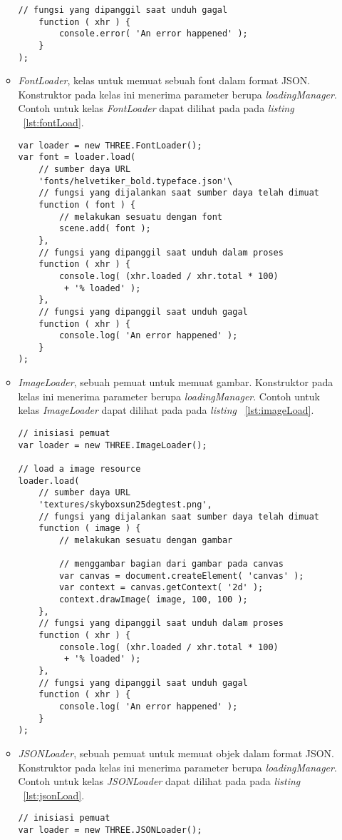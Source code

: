 \begin{itemize}
\begin{itemize}
\begin{lstlisting}[caption={Contoh penggunaan kelas {\it FileLoader} untuk berkas dengan format TXT.}, label={lst:fileLoad},captionpos=b]
    // fungsi yang dipanggil saat unduh gagal
    function ( xhr ) {
        console.error( 'An error happened' );
    }
);
\end{lstlisting}
		\item {\it FontLoader}, kelas untuk memuat sebuah font dalam format JSON. Konstruktor pada kelas ini menerima parameter berupa  {\it loadingManager}. Contoh untuk kelas {\it FontLoader} dapat dilihat pada pada {\it listing} ~\ref{lst:fontLoad}.
\begin{lstlisting}[caption={Contoh penggunaan kelas {\it FontLoader}.}, label={lst:fontLoad},captionpos=b]
var loader = new THREE.FontLoader();
var font = loader.load(
	// sumber daya URL
	'fonts/helvetiker_bold.typeface.json'\
	// fungsi yang dijalankan saat sumber daya telah dimuat
	function ( font ) {
		// melakukan sesuatu dengan font
		scene.add( font );
	},
	// fungsi yang dipanggil saat unduh dalam proses
	function ( xhr ) {
		console.log( (xhr.loaded / xhr.total * 100)
		 + '% loaded' );
	},
	// fungsi yang dipanggil saat unduh gagal
	function ( xhr ) {
		console.log( 'An error happened' );
	}
);
\end{lstlisting}
		\item {\it ImageLoader}, sebuah pemuat untuk memuat gambar. Konstruktor pada kelas ini menerima parameter berupa  {\it loadingManager}. Contoh untuk kelas {\it ImageLoader} dapat dilihat pada pada {\it listing} ~\ref{lst:imageLoad}.
\begin{lstlisting}[caption={Contoh penggunaan kelas {\it ImageLoader}.}, label={lst:imageLoad},captionpos=b]
// inisiasi pemuat
var loader = new THREE.ImageLoader();

// load a image resource
loader.load(
	// sumber daya URL
	'textures/skyboxsun25degtest.png',
	// fungsi yang dijalankan saat sumber daya telah dimuat
	function ( image ) {
		// melakukan sesuatu dengan gambar

		// menggambar bagian dari gambar pada canvas
		var canvas = document.createElement( 'canvas' );
		var context = canvas.getContext( '2d' );
		context.drawImage( image, 100, 100 );
	},
	// fungsi yang dipanggil saat unduh dalam proses
	function ( xhr ) {
		console.log( (xhr.loaded / xhr.total * 100)
		 + '% loaded' );
	},
	// fungsi yang dipanggil saat unduh gagal
	function ( xhr ) {
		console.log( 'An error happened' );
	}
);
\end{lstlisting}
		\item {\it JSONLoader}, sebuah pemuat untuk memuat objek dalam format JSON. Konstruktor pada kelas ini menerima parameter berupa  {\it loadingManager}. Contoh untuk kelas {\it JSONLoader} dapat dilihat pada pada {\it listing} ~\ref{lst:jsonLoad}.
\begin{lstlisting}[caption={Contoh penggunaan kelas {\it JSONLoader}.}, label={lst:jsonLoad},captionpos=b]
// inisiasi pemuat
var loader = new THREE.JSONLoader();


\end{lstlisting}
\end{itemize}
\end{itemize}
